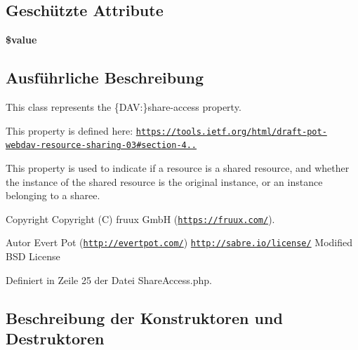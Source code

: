\subsection*{Geschützte Attribute}
\begin{DoxyCompactItemize}
\item 
\mbox{\label{class_sabre_1_1_d_a_v_1_1_xml_1_1_property_1_1_share_access_a49ce0984129d4d9a7336e456b7fe65f2}} 
{\bfseries \$value}
\end{DoxyCompactItemize}


\subsection{Ausführliche Beschreibung}
This class represents the \{D\+AV\+:\}share-\/access property.

This property is defined here\+: \href{https://tools.ietf.org/html/draft-pot-webdav-resource-sharing-03#section-4.4.1}{\tt https\+://tools.\+ietf.\+org/html/draft-\/pot-\/webdav-\/resource-\/sharing-\/03\#section-\/4..}

This property is used to indicate if a resource is a shared resource, and whether the instance of the shared resource is the original instance, or an instance belonging to a sharee.

\begin{DoxyCopyright}{Copyright}
Copyright (C) fruux GmbH (\href{https://fruux.com/}{\tt https\+://fruux.\+com/}). 
\end{DoxyCopyright}
\begin{DoxyAuthor}{Autor}
Evert Pot (\href{http://evertpot.com/}{\tt http\+://evertpot.\+com/})  \href{http://sabre.io/license/}{\tt http\+://sabre.\+io/license/} Modified B\+SD License 
\end{DoxyAuthor}


Definiert in Zeile 25 der Datei Share\+Access.\+php.



\subsection{Beschreibung der Konstruktoren und Destruktoren}
\mbox{\label{class_sabre_1_1_d_a_v_1_1_xml_1_1_property_1_1_share_access_a63cbf6b112aa31f3a0edfa27a7cdac02}} 
